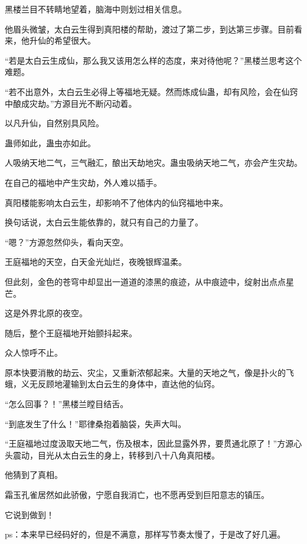 \begin{this_body}
黑楼兰目不转睛地望着，脑海中则划过相关信息。

他眉头微皱，太白云生得到真阳楼的帮助，渡过了第二步，到达第三步骤。目前看来，他升仙的希望很大。

“若是太白云生成仙，那么我又该用怎么样的态度，来对待他呢？”黑楼兰思考这个难题。

“若不出意外，太白云生必得上等福地无疑。然而炼成仙蛊，却有风险，会在仙窍中酿成灾劫。”方源目光不断闪动着。

以凡升仙，自然别具风险。

蛊师如此，蛊虫亦如此。

人吸纳天地二气，三气融汇，酿出天劫地灾。蛊虫吸纳天地二气，亦会产生灾劫。

在自己的福地中产生灾劫，外人难以插手。

真阳楼能影响太白云生，却影响不了他体内的仙窍福地中来。

换句话说，太白云生能依靠的，就只有自己的力量了。

“嗯？”方源忽然仰头，看向天空。

王庭福地的天空，白天金光灿烂，夜晚银辉温柔。

但此刻，金色的苍穹中却显出一道道的漆黑的痕迹，从中痕迹中，绽射出点点星芒。

这是外界北原的夜空。

随后，整个王庭福地开始颤抖起来。

众人惊呼不止。

原本快要消散的劫云、灾尘，又重新浓郁起来。大量的天地之气，像是扑火的飞蛾，义无反顾地灌输到太白云生的身体中，直达他的仙窍。

“怎么回事？！”黑楼兰瞠目结舌。

“到底发生了什么！”耶律桑抱着脑袋，失声大叫。

“王庭福地过度汲取天地二气，伤及根本，因此显露外界，要贯通北原了！”方源心头震动，目光从太白云生的身上，转移到八十八角真阳楼。

他猜到了真相。

霜玉孔雀居然如此骄傲，宁愿自我消亡，也不愿再受到巨阳意志的镇压。

它说到做到！

ps：本来早已经码好的，但是不满意，那样写节奏太慢了，于是改了好几遍。

\end{this_body}

